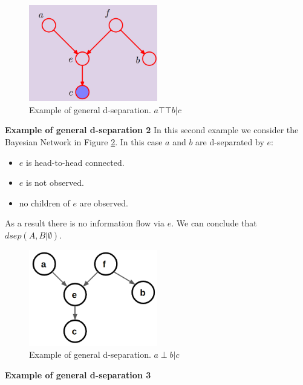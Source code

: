 \begin{figure}
    \centering
    \includegraphics[width=0.5\textwidth]{images/exampleGeneralDSeparation1.png}
    \caption{Example of general d-separation. $a \top\!\!\!\!\top b | c$ }
    \label{fig:exampleDSeparation1}
\end{figure}

\textbf{Example of general d-separation 2} \newline
In this second example we consider the Bayesian Network in Figure \ref{fig:exampleDSeparation1.1}. In this case $a$ and $b$ are d-separated by $e$:
\begin{itemize}
    \item $e$ is head-to-head connected.
    \item $e$ is not observed.
    \item no children of $e$ are observed.
\end{itemize}

As a result there is no information flow via $e$. We can conclude that $\mathit{dsep}(A,B | \emptyset)$. \newline

\begin{figure}
    \centering
    \includegraphics[width=0.5\textwidth]{images/exampleGeneralDSeparation1.1.png}
    \caption{Example of general d-separation. $a \perp b | c$ }
    \label{fig:exampleDSeparation1.1}
\end{figure}

\textbf{Example of general d-separation 3}

